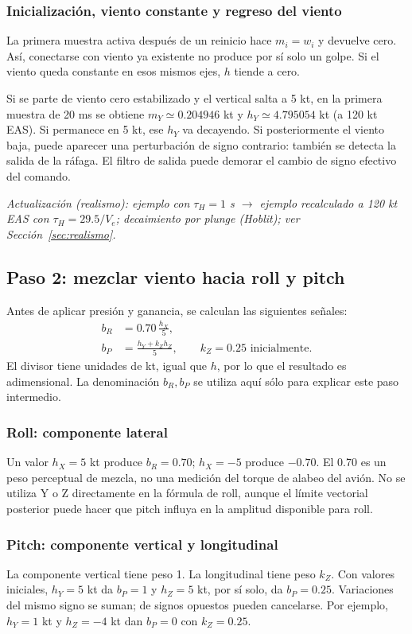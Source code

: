 \documentclass[11pt,a4paper]{article}
\begin{document}
\subsubsection{Inicialización, viento constante y regreso del viento}
La primera muestra activa después de un reinicio hace $m_i=w_i$ y devuelve cero. Así, conectarse con viento ya existente no produce por sí solo un golpe. Si el viento queda constante en esos mismos ejes, $h$ tiende a cero.

Si se parte de viento cero estabilizado y el vertical salta a 5 kt, en la primera muestra de 20 ms se obtiene $m_Y\simeq0.204946$ kt y $h_Y\simeq4.795054$ kt (a 120 kt EAS). Si permanece en 5 kt, ese $h_Y$ va decayendo. Si posteriormente el viento baja, puede aparecer una perturbación de signo contrario: también se detecta la salida de la ráfaga. El filtro de salida puede demorar el cambio de signo efectivo del comando.

\textit{Actualización (realismo): ejemplo con $\tau_H=1$ s $\rightarrow$ ejemplo recalculado a 120 kt EAS con $\tau_H=29.5/V_e$; decaimiento por plunge (Hoblit); ver Sección~\ref{sec:realismo}.}

\subsection{Paso 2: mezclar viento hacia roll y pitch}
Antes de aplicar presión y ganancia, se calculan las siguientes señales:
\begin{align}
b_R&=0.70\,\frac{h_X}{5},\\
b_P&=\frac{h_Y+k_Zh_Z}{5},\qquad k_Z=0.25\text{ inicialmente}.
\label{eq:turb-mix}
\end{align}
El divisor tiene unidades de kt, igual que $h$, por lo que el resultado es adimensional. La denominación $b_R,b_P$ se utiliza aquí sólo para explicar este paso intermedio.

\subsubsection{Roll: componente lateral}
Un valor $h_X=5$ kt produce $b_R=0.70$; $h_X=-5$ produce $-0.70$. El 0.70 es un peso perceptual de mezcla, no una medición del torque de alabeo del avión. No se utiliza Y o Z directamente en la fórmula de roll, aunque el límite vectorial posterior puede hacer que pitch influya en la amplitud disponible para roll.

\subsubsection{Pitch: componente vertical y longitudinal}
La componente vertical tiene peso 1. La longitudinal tiene peso $k_Z$. Con valores iniciales, $h_Y=5$ kt da $b_P=1$ y $h_Z=5$ kt, por sí solo, da $b_P=0.25$. Variaciones del mismo signo se suman; de signos opuestos pueden cancelarse. Por ejemplo, $h_Y=1$ kt y $h_Z=-4$ kt dan $b_P=0$ con $k_Z=0.25$.
\end{document}
